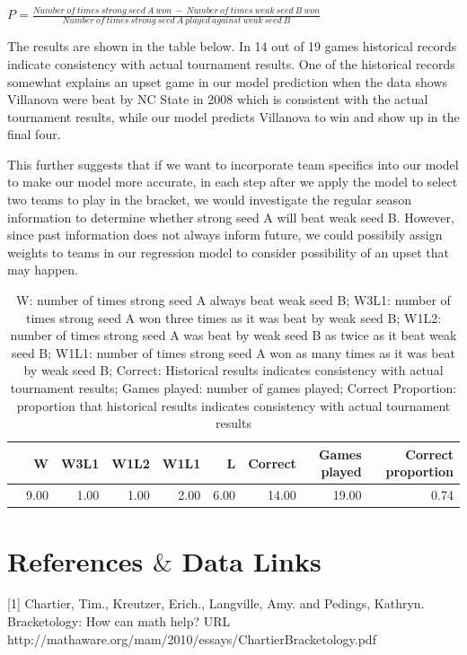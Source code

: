 \documentclass{article} %
\begin{document}
$P=\frac{Number \ of \ times \ strong \ seed \ A \ won \ - \ Number \ of \ times \ weak \ seed \ B \ won}{Number \ of \ times \ strong \ seed \ A \ played \ against \ weak \ seed \ B }$


The results are shown in the table below. In 14 out of 19 games historical records indicate consistency with actual tournament results. One of the historical records somewhat explains an upset game in our model prediction when the data shows Villanova were beat by NC State in 2008 which is consistent with the actual tournament results, while our model predicts Villanova to win and show up in the final four. 

This further suggests that if we want to incorporate team specifics into our model to make our model more accurate, in each step after we apply the model to select two teams to play in the bracket, we would investigate the regular season information to determine whether strong seed A will beat weak seed B. However, since past information does not always inform future, we could possibily assign weights to teams in our regression model to consider possibility of an upset that may happen. 


\begin{table}[ht]
\centering
\begin{tabular}{rrrrrrrrr}
\hline
& W & W3L1 & W1L2 & W1L1 & L & Correct & Games played & Correct proportion \\ 
\hline
& 9.00 & 1.00 & 1.00 & 2.00 & 6.00 & 14.00 & 19.00 & 0.74 \\ 
\hline
\end{tabular}

\caption{W: number of times strong seed A always beat weak seed B; W3L1: number of times strong seed A won three times as it was beat by weak seed B; W1L2: number of times strong seed A was beat by weak seed B as twice as it beat weak seed B; W1L1: number of times strong seed A won as many times as it was beat by weak seed B; Correct: Historical results indicates consistency with actual tournament results; Games played: number of games played; Correct Proportion: proportion that historical results indicates consistency with actual tournament results}
\end{table}




\newpage
\section{References $\&$ Data Links}
[1] Chartier, Tim., Kreutzer, Erich., Langville,  Amy. and Pedings, Kathryn. Bracketology: How can math help? URL http://mathaware.org/mam/2010/essays/ChartierBracketology.pdf
\end{document}
